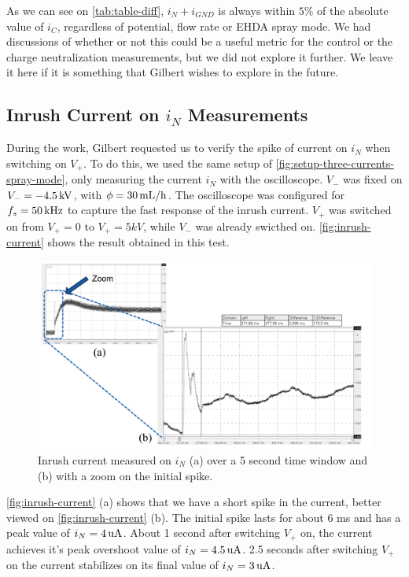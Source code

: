 \documentclass[oneside,12pt]{article}
\begin{document}
As we can see on \autoref{tab:table-diff}, $i_N + i_{GND}$ is always within $5\%$ of the absolute value of $i_C$, regardless of potential,
flow rate or EHDA spray mode. We had discussions of whether 
or not this could be a useful metric for the control or the charge neutralization measurements, but we did not explore it further. We leave it here 
if it is something that Gilbert wishes to explore in the future. 

\subsection{Inrush Current on $i_N$ Measurements}

During the work, Gilbert requested us to verify the spike of current on $i_N$ when switching on $V_+$. To do this, we used the same setup 
of \autoref{fig:setup-three-currents-spray-mode}, only measuring the current $i_N$ with the oscilloscope. $V_-$ was fixed on $V_- = - 4.5 \,\mathrm{kV}$, 
with $\phi = 30 \,\mathrm{mL/h}$. The oscilloscope was configured for $f_s = 50 \,\mathrm{kHz}$ to capture the fast response of the inrush current.
$V_+$ was switched on from $V_+ = 0$ to $V_+ = 5 kV$, while $V_-$ was already swicthed on. \autoref{fig:inrush-current} shows the result 
obtained in this test.

\begin{figure}[h!]
    \centering
    \includegraphics[width=\textwidth,trim=1 1 1 1,clip]{figures/inrush-current.png}
    \caption{Inrush current measured on $i_N$ (a) over a 5 second time window and (b) with a zoom on the initial spike.}
    \label{fig:inrush-current}
\end{figure}

\autoref{fig:inrush-current} (a) shows that we have a short spike in the current, better viewed on \autoref{fig:inrush-current} (b).
The initial spike lasts for about 6 ms and has a peak value of $i_N = 4 \,\mathrm{uA}$. About 1 second after switching $V_+$ on, the
current achieves it's peak overshoot value of $i_N = 4.5 \,\mathrm{uA}$. 2.5 seconds after switching $V_+$ on the current stabilizes 
on its final value of $i_N = 3 \,\mathrm{uA}$.
\end{document}
